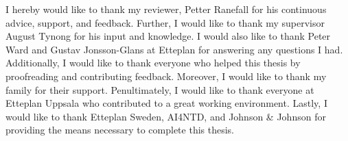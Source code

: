 \begin{acknowledgements}
    I hereby would like to thank my reviewer, Petter Ranefall for his continuous advice, support, and feedback. Further, I would like to thank my supervisor August Tynong for his input and knowledge. I would also like to thank Peter Ward and Gustav Jonsson-Glans at Etteplan for answering any questions I had. Additionally, I would like to thank everyone who helped this thesis by proofreading and contributing feedback. Moreover, I would like to thank my family for their support. Penultimately, I would like to thank everyone at Etteplan Uppsala who contributed to a great working environment. Lastly, I would like to thank Etteplan Sweden, AI4NTD, and Johnson \& Johnson for providing the means necessary to complete this thesis.
\end{acknowledgements}
  

